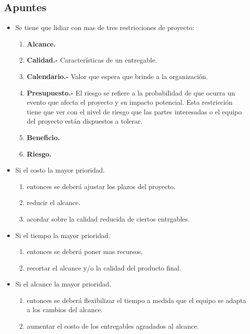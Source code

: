 \documentclass[10pt]{book}
\begin{document}
	\subsection{Apuntes}
	\begin{itemize}
	    \item Se tiene que lidiar con mas de tres restricciones de proyecto:
	    \begin{enumerate}[1.]
		\item \textbf{Alcance.}
		\item \textbf{Calidad.-} Características de un entregable.
		\item \textbf{Calendario.-} Valor que espera que brinde a la organización.
		\item \textbf{Presupuesto.-} El riesgo se refiere a la probabilidad de que ocurra un evento que afecta el proyecto y su impacto potencial. Esta restricción tiene que ver con el nivel de riesgo que las partes interesadas o el equipo del proyecto están dispuestos a tolerar.
		\item \textbf{Beneficio.}
		\item \textbf{Riesgo.}
	    \end{enumerate}
	    \item Si el costo la mayor prioridad.
	    \begin{enumerate}[1.]
		\item entonces se deberá ajustar los plazos del proyecto.
		\item reducir el alcance.
		\item acordar sobre la calidad reducida de ciertos entrgables.
	    \end{enumerate}
	    \item Si el tiempo la mayor prioridad.
	    \begin{enumerate}[1.]
		\item entonces se deberá poner mas recursos,
		\item recortar el alcance y/o la calidad del producto final.
	    \end{enumerate}
	    \item Si el alcance la mayor prioridad.
	    \begin{enumerate}[1.]
		\item entonces se deberá flexibilizar el tiempo a medida que el equipo se adapta a los cambios del alcance.
		\item aumentar el costo de los entregables agradados al alcance.
	    \end{enumerate}
	\end{itemize}
\end{document}
